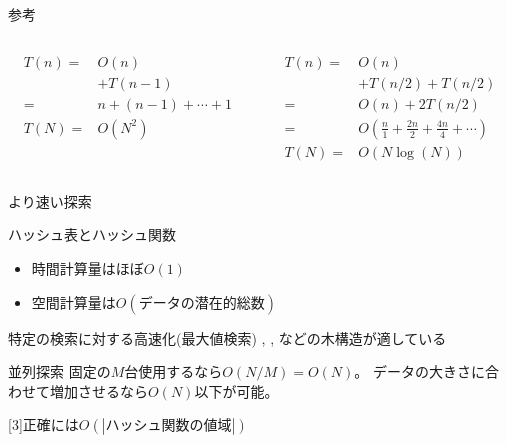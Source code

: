 \documentclass{beamer}
\begin{document}
\begin{frame}[fragile]{参考}{}

\begin{columns}[T]
\begin{column}{0.5\textwidth}
\begin{align*}
T(n) = & O(n) \\
& + T(n-1)\\
= & n + (n - 1) + \cdots + 1 \\
T(N) = & O(N^2)
\end{align*}
\end{column}

\begin{column}{0.5\textwidth}
\begin{align*}
T(n) = & O(n) \\
& + T(n/2) + T(n/2)\\
= & O(n) + 2T(n/2) \\
= & O\left(\frac{n}{1} + \frac{2n}{2} + \frac{4n}{4} + \cdots \right) \\
T(N) = & O(N\log(N))
\end{align*}
\end{column}
\end{columns}

\end{frame}

\begin{frame}[fragile]{より速い探索}{}
\begin{block}{ハッシュ表とハッシュ関数}
\begin{itemize}%
\item 時間計算量はほぼ$O(1)$
\item 空間計算量は$O(データの潜在的総数)$\footnotemark
\end{itemize}
\end{block}

\begin{block}{特定の検索に対する高速化(最大値検索)}
\href{https://ja.wikipedia.org/wiki/赤黒木}{},
\href{https://ja.wikipedia.org/wiki/トライ_(データ構造)}{},
\href{https://ja.wikipedia.org/wiki/2-3-4木}{}などの木構造が適している
\end{block}

\begin{block}{並列探索}
固定の$M$台使用するなら$O(N/M) = O(N)$。
データの大きさに合わせて増加させるなら$O(N)$以下が可能。
\end{block}

[3]{正確には$O(|ハッシュ関数の値域|)$}

\end{frame}
\end{document}
